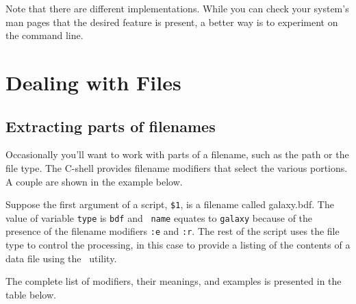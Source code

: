 \documentclass[twoside,11pt,nolof]{starlink}
\providecommand{\HDSTRACEref}{\xref{{\footnotesize HDSTRACE}\normalsize}{sun102}{}}
\begin{document}
Note that there are different implementations.  While you can check
your system's man pages that the desired feature is present, a better
way is to experiment on the command line.

\newpage
\section{Dealing with Files\label{sc4_se_files}}


\subsection{Extracting parts of filenames
\label{sc4_se_filename_ext}}

Occasionally you'll want to work with parts of a filename, such as the
path or the file type.  The C-shell provides \textsf{filename modifiers}
that select the various portions.  A couple are shown in the example
below.

\begin{small}
\end{small}

Suppose the first argument of a script, \texttt{\$1}, is a filename called
galaxy.bdf.  The value of variable \texttt{type} is \texttt{bdf} and {\tt
name} equates to \texttt{galaxy} because of the presence of the filename
modifiers \texttt{:e} and \texttt{:r}.  The rest of the script uses the
file type to control the processing, in this case to provide a listing
of the contents of a data file using the \HDSTRACEref\ utility.

The complete list of modifiers, their meanings, and examples is
presented in the table below.
\bigskip
\end{document}
